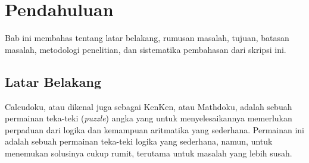 \chapter{Pendahuluan}
\label{chap:pendahuluan}

Bab ini membahas tentang latar belakang, rumusan masalah, tujuan, batasan masalah, metodologi penelitian, dan sistematika pembahasan dari skripsi ini.

\section{Latar Belakang}
\label{sec:label}
Calcudoku, atau dikenal juga sebagai KenKen, atau Mathdoku, adalah sebuah permainan teka-teki (\textit{puzzle}) angka yang untuk menyelesaikannya memerlukan perpaduan dari logika dan kemampuan aritmatika yang sederhana. Permainan ini adalah sebuah permainan teka-teki logika yang sederhana, namun, untuk menemukan solusinya cukup rumit, terutama untuk masalah yang lebih susah.

